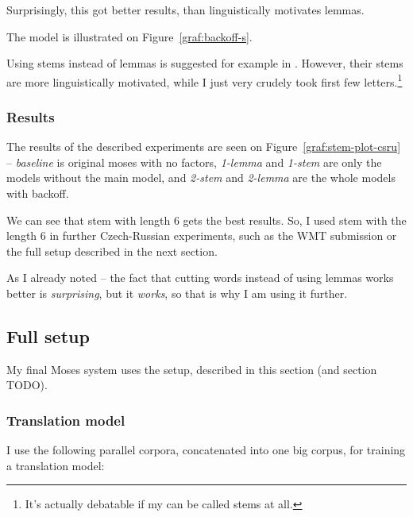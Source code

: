 Surprisingly, this got better results, than linguistically motivates lemmas.


The model is illustrated on Figure~\ref{graf:backoff-s}.



Using stems instead of lemmas is suggested for example in \cite{stemy}. However, their stems are more linguistically motivated, while I just very crudely took first few letters.\footnote{It's actually debatable if my  can be called stems at all.}


\subsubsection{Results}


The results of the described experiments are seen on Figure~\ref{graf:stem-plot-csru} -- \emph{baseline} is original moses with no factors, \emph{1-lemma} and \emph{1-stem} are only the  models without the main model, and \emph{2-stem} and \emph{2-lemma} are the whole models with backoff.
 
We can see that stem with length 6 gets the best results. So, I used stem with the length 6 in further Czech-Russian experiments, such as the WMT submission \cite{mujpaper} or the full setup described in the next section.

As I already noted -- the fact that cutting words instead of using lemmas works better is \emph{surprising}, but it \emph{works}, so that is why I am using it further. 

\subsection{Full setup}
My final Moses system uses the setup, described in this section (and section TODO). 


\subsubsection{Translation model}
I use the following parallel corpora, concatenated into one big  corpus, for training a translation model:

